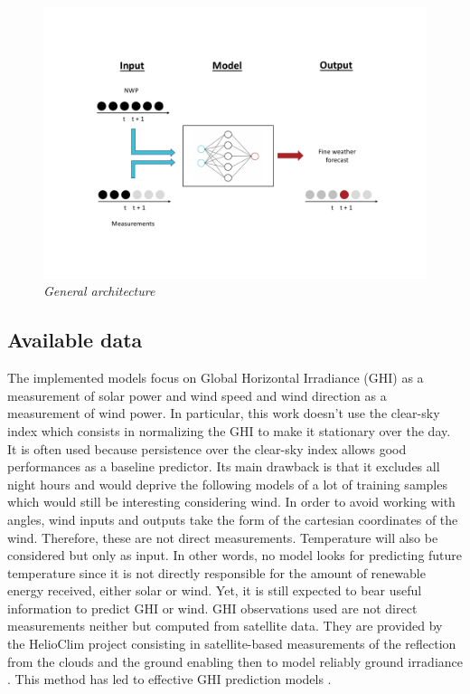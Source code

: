 \documentclass{article}
\begin{document}

\vspace{-30px}

\begin{figure}[H]
    \centering
    \includegraphics[width=\linewidth]{img/structure.pdf}
    \vspace{-30px}
    \caption{\textit{General architecture}}
   \label{fig:Fig. 1}
\end{figure}

\subsection*{Available data}

The implemented models focus on Global Horizontal Irradiance (GHI) as a measurement of solar power
and wind speed and wind direction as a measurement of wind power.
In particular, this work doesn't use the clear-sky index which consists in normalizing the GHI to make it
stationary over the day. It is often used because persistence over the clear-sky index allows good performances
as a baseline predictor. Its main drawback is that it excludes all night hours and would deprive the following models
of a lot of training samples which would still be interesting considering wind.
In order to avoid working with angles, wind inputs and outputs
take the form of the cartesian coordinates of the wind. Therefore, these are not direct measurements. Temperature will
also be considered but only as input. In other words, no model looks for predicting future temperature since it is
not directly responsible for the amount of renewable energy received, either solar or wind. Yet, it is still expected to
bear useful information to predict GHI or wind. GHI observations used are not direct measurements neither but
computed from satellite data. They are provided by the HelioClim project consisting in satellite-based measurements
of the reflection from the clouds and the ground enabling then to model reliably ground irradiance
\cite{blanc_helioclim_2011}. This method has led to effective GHI prediction models
\cite{linares-rodriguez_artificial_2013, mazorra_aguiar_use_2015}.
\end{document}
